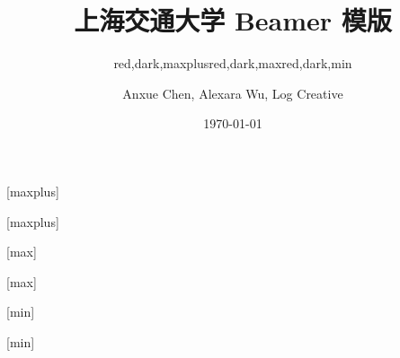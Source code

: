 \documentclass[]{ctexbeamer}
\begin{document}
\title[SJTU Beamer Template] %
{\textbf{上海交通大学 Beamer 模版}} %

\author[Anxue Chen, Alexara Wu, Log Creative]
{Anxue Chen, Alexara Wu, Log Creative}


\date{\today}

\subtitle{red,dark,maxplus}
\logo{\resizebox{!}{0.7cm}{\cnlogo}}
[maxplus]
\maketitle
{}[maxplus]
\makebottom

\subtitle{red,dark,max}
\logo{\resizebox{!}{1cm}{\sjtubadge}}
\titlegraphic{\sjtubg[opacity=0.2]}
[max]
\maketitle
{}[max]
\makebottom

\subtitle{red,dark,min}
\logo{\resizebox{!}{0.7cm}{\enlogo}}
[min]
\maketitle
{}[min]
\makebottom
\end{document}
